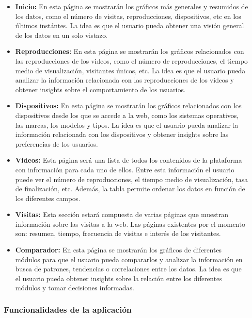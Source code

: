 \begin{itemize}
    \item \textbf{Inicio:} En esta página se mostrarán los gráficos más generales y resumidos de los datos, como el número de visitas, 
    reproducciones, dispositivos, etc en los últimos instántes. La idea es que el usuario pueda obtener una visión general de los datos en un solo vistazo.
    \item \textbf{Reproducciones:} En esta página se mostrarán los gráficos relacionados con las reproducciones de los videos, como el 
    número de reproducciones, el tiempo medio de visualización, visitantes únicos, etc. La idea es que el usuario pueda analizar la 
    información relacionada con las reproducciones de los videos y obtener insights sobre el comportamiento de los usuarios.
    \item \textbf{Dispositivos:} En esta página se mostrarán los gráficos relacionados con los dispositivos desde los que se accede a la web, 
    como los sistemas operativos, las marcas, los modelos y tipos. La idea es que el usuario pueda analizar la información relacionada con los 
    dispositivos y obtener insights sobre las preferencias de los usuarios.
    \item \textbf{Videos:} Esta página será una lista de todos los contenidos de la plataforma con información para cada uno de ellos. Entre 
    esta información el usuario puede ver el número de reproducciones, el tiempo medio de visualización, tasa de finalización, etc. Además, 
    la tabla permite ordenar los datos en función de los diferentes campos. 
    \item \textbf{Visitas:} Esta sección estará compuesta de varias páginas que muestran información sobre las visitas a la web. Las páginas 
    existentes por el momento son: resumen, tiempo, frecuencia de visitas e interés de los visitantes.
    \item \textbf{Comparador:} En esta página se mostrarán los gráficos de diferentes módulos para que el usuario pueda compararlos y analizar 
    la información en busca de patrones, tendencias o correlaciones entre los datos. La idea es que el usuario pueda obtener insights sobre la 
    relación entre los diferentes módulos y tomar decisiones informadas.
\end{itemize}


\subsubsection{Funcionalidades de la aplicación}
\label{sec:diseno-funcionalidades}

